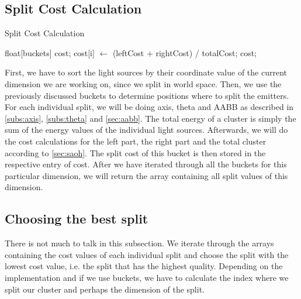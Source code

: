 \subsection{Split Cost Calculation}
\label{subs:splitcost}

\begin{algorithm}
	\caption{Split Cost Calculation}
	\label{alg:splitcostcalculation}
	\begin{algorithmic}[1] %
		\State float[buckets] cost;
		\State <calculate axis, thetas, AABB and energy for the left part>
		\State <calculate axis, thetas, AABB and energy for the right part>
		\State <calculate leftCost, rightCost and totalCost>
		\State cost[i] $\gets$ (leftCost + rightCost) / totalCost;
		\EndFor
\State \Return cost;
\EndProcedure
\end{algorithmic}
\end{algorithm}

First, we have to sort the light sources by their coordinate value of the current dimension we are working on, since we split in world space. Then, we use the previously discussed buckets to determine positions where to split the emitters. For each individual split, we will be doing axis, theta and AABB as described in \ref{subs:axis}, \ref{subs:theta} and \ref{sec:aabb}. The total energy of a cluster is simply the sum of the energy values of the individual light sources. Afterwards, we will do the cost calculations for the left part, the right part and the total cluster according to \ref{sec:saoh}. The split cost of this bucket is then stored in the respective entry of cost. After we have iterated through all the buckets for this particular dimension, we will return the array containing all split values of this dimension.

\subsection{Choosing the best split}

There is not much to talk in this subsection. We iterate through the arrays containing the cost values of each individual split and choose the split with the lowest cost value, i.e. the split that has the highest quality. Depending on the implementation and if we use buckets, we have to calculate the index where we split our cluster and perhaps the dimension of the split.

